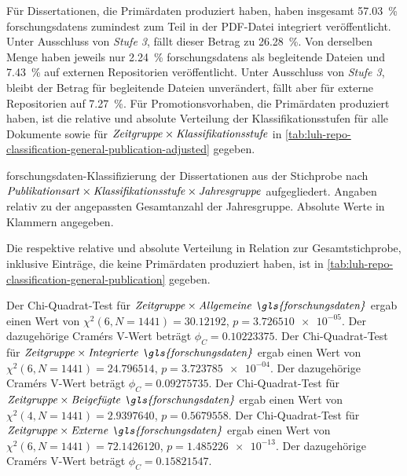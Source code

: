 Für Dissertationen, die Primärdaten produziert haben, haben insgesamt \SI{57,03}{\percent} \glspl{forschungsdaten} zumindest zum Teil in der PDF-Datei integriert veröffentlicht.
Unter Ausschluss von \textit{Stufe 3}, fällt dieser Betrag zu \SI{26,28}{\percent}.
Von derselben Menge haben jeweils nur \SI{2,24}{\percent} \glspl{forschungsdaten} als begleitende Dateien und \SI{7,43}{\percent} auf externen Repositorien veröffentlicht.
Unter Ausschluss von \textit{Stufe 3}, bleibt der Betrag für begleitende Dateien unverändert, fällt aber für externe Repositorien auf \SI{7,27}{\percent}.
Für Promotionsvorhaben, die Primärdaten produziert haben, ist die relative und absolute Verteilung der Klassifikationsstufen für alle Dokumente sowie für $\text{\textit{Zeitgruppe}}\times\text{\textit{Klassifikationsstufe}}$ in \cref{tab:luh-repo-classification-general-publication-adjusted} gegeben.
\begin{table}[!htbp]
	\caption{\gls{forschungsdaten}-Klassifizierung der Dissertationen aus der Stichprobe nach $\text{\textit{Publikationsart}}\times\text{\textit{Klassifikationsstufe}}\times\text{\textit{Jahresgruppe}}$ aufgegliedert.
    Angaben relativ zu der angepassten Gesamtanzahl der Jahresgruppe.
    Absolute Werte in Klammern angegeben.}
    
    \label{tab:luh-repo-classification-general-publication-adjusted}
\end{table}
Die respektive relative und absolute Verteilung in Relation zur Gesamtstichprobe, inklusive Einträge, die keine Primärdaten produziert haben, ist in \cref{tab:luh-repo-classification-general-publication} gegeben.

Der Chi-Quadrat-Test für $\text{\textit{Zeitgruppe}}\times\text{\textit{Allgemeine \gls{forschungsdaten}}}$ ergab einen Wert von $\chi^2 (\num{6}, N = \num{1441}) = \num[round-mode=places,round-precision=3]{30.12192}$, $p = \num[round-mode=places,round-precision=3]{3.726510e-05}$.
Der dazugehörige Cramérs V-Wert beträgt $\phi_C=\num[round-mode=places,round-precision=3]{0.10223375}$.
Der Chi-Quadrat-Test für $\text{\textit{Zeitgruppe}}\times\text{\textit{Integrierte \gls{forschungsdaten}}}$ ergab einen Wert von $\chi^2 (\num{6}, N = \num{1441}) = \num[round-mode=places,round-precision=3]{24.796514}$, $p = \num[round-mode=places,round-precision=3]{3.723785e-04}$.
Der dazugehörige Cramérs V-Wert beträgt $\phi_C=\num[round-mode=places,round-precision=3]{0.09275735}$.
Der Chi-Quadrat-Test für $\text{\textit{Zeitgruppe}}\times\text{\textit{Beigefügte \gls{forschungsdaten}}}$ ergab einen Wert von $\chi^2 (\num{4}, N = \num{1441}) = \num[round-mode=places,round-precision=3]{2.9397640}$, $p = \num[round-mode=places,round-precision=3]{0.5679558}$.
Der Chi-Quadrat-Test für $\text{\textit{Zeitgruppe}}\times\text{\textit{Externe \gls{forschungsdaten}}}$ ergab einen Wert von $\chi^2 (\num{6}, N = \num{1441}) = \num[round-mode=places,round-precision=3]{72.1426120}$, $p = \num[round-mode=places,round-precision=3]{1.485226e-13}$.
Der dazugehörige Cramérs V-Wert beträgt $\phi_C=\num[round-mode=places,round-precision=3]{0.15821547}$.

